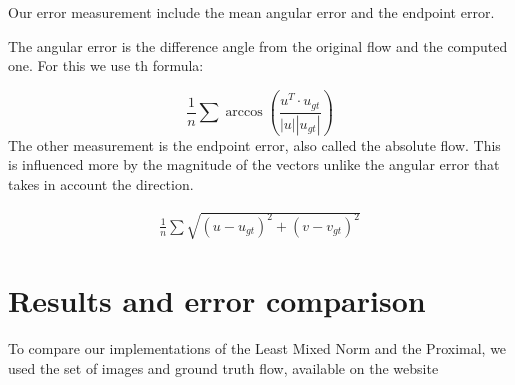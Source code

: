 \documentclass[12pt,a4paper,twoside]{report}
\begin{document}
{Our error measurement include the mean angular error and the endpoint error. 

The angular error is the difference angle from the original flow and  the computed one. For this we use th formula:

$$
\frac{1}{n}\sum  \arccos \left( \frac{u^T \cdot u_{gt}}{|u||u_{gt}|}\right)
$$
The other measurement is the endpoint error, also called the absolute flow. This is influenced more by the magnitude of the vectors unlike the angular error that takes in account the direction.

\begin{equation}
\begin{split}
\frac{1}{n}\sum  \sqrt{(u-u_{gt})^2+(v-v_{gt})^2} 
\end{split}
\end{equation}


\section{Results and error comparison}

To compare our implementations of the  Least Mixed Norm and the Proximal, we used the set of images and ground truth flow, available on the website \cite{middleburry}

}
\end{document}
